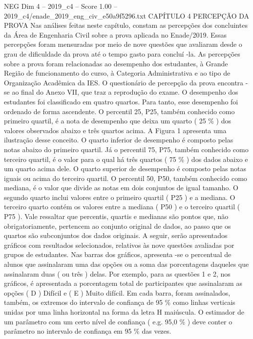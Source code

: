 \begin{textsample}{NEG Dim 4 – 2019\_c4 – Score 1.00 – 2019\_c4/enade\_2019\_eng\_civ\_e50a9f5296.txt}  \label{ex:f4_neg_241}
CAPÍTULO 4 PERCEPÇÃO DA PROVA Nas análises feitas neste capítulo, constam as percepções dos concluintes da Área de Engenharia Civil sobre a prova aplicada no Enade/2019.
Essas percepções foram mensuradas por meio de nove questões que avaliaram desde o grau de dificuldade da prova até o tempo gasto para concluí -la.
As percepções sobre a prova foram relacionadas ao desempenho dos estudantes, à Grande Região de funcionamento do curso, à Categoria Administrativa e ao tipo de Organização Acadêmica da IES.
O questionário de percepção da prova encontra -se ao final do Anexo VII, que traz a reprodução do exame.
O desempenho dos estudantes foi classificado em quatro quartos.
Para tanto, esse desempenho foi ordenado de forma ascendente.
O percentil 25, P25, também conhecido como primeiro quartil, é a nota de desempenho que deixa um quarto ( 25 \% ) dos valores observados abaixo e três quartos acima.
A Figura 1 apresenta uma ilustração desse conceito.
O quarto inferior de desempenho é composto pelas notas abaixo do primeiro quartil.
Já o percentil 75, P75, também conhecido como terceiro quartil, é o valor para o qual há três quartos ( 75 \% ) dos dados abaixo e um quarto acima dele.
O quarto superior de desempenho é composto pelas notas iguais ou acima do terceiro quartil.
O percentil 50, P50, também conhecido como mediana, é o valor que divide as notas em dois conjuntos de igual tamanho.
O segundo quarto inclui valores entre o primeiro quartil ( P25 ) e a mediana.
O terceiro quarto contém os valores entre a mediana ( P50 ) e o terceiro quartil ( P75 ).
Vale ressaltar que percentis, quartis e medianas são pontos que, não obrigatoriamente, pertencem ao conjunto original de dados, ao passo que os quartos são subconjuntos dos dados originais.
A seguir, serão apresentados gráficos com resultados selecionados, relativos às nove questões avaliadas por grupos de estudantes.
Nas barras dos gráficos, apresenta -se o percentual de alunos que assinalaram uma das opções ou a soma das porcentagens daqueles que assinalaram duas ( ou três ) delas.
Por exemplo, para as questões 1 e 2, nos gráficos, é apresentada a porcentagem total de participantes que assinalaram as opções ( D ) Difícil e ( E ) Muito difícil.
Em cada barra, foram assinalados, também, os extremos do intervalo de confiança de 95 \% como linhas verticais unidas por uma linha horizontal na forma da letra H maiúscula.
O estimador de um parâmetro com um certo nível de confiança ( e.g. 95,0 \% ) deve conter o parâmetro no intervalo de confiança em 95 \% das vezes.

\end{textsample}
